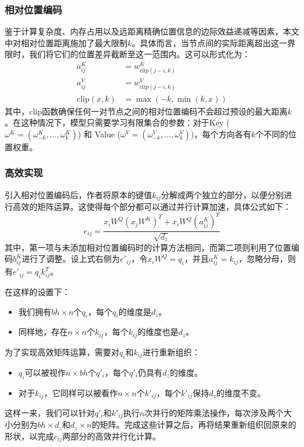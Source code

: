 \subsubsection{相对位置编码}
鉴于计算复杂度、内存占用以及远距离精确位置信息的边际效益递减等因素，本文中对相对位置距离施加了最大限制$k$。具体而言，当节点间的实际距离超出这一界限时，我们将它们的位置差异截断至这一范围内。这可以形式化为：
\begin{align*}
    a_{ij}^K &= w_{\text{clip}(j-i, k)}^K\\
    a_{ij}^V &= w_{\text{clip}(j-i, k)}^V\\
    \text{clip}(x, k) &= \max(-k, \min(k, x))
\end{align*}
其中，$\text{clip}$函数确保任何一对节点之间的相对位置编码不会超过预设的最大距离$k$。在这种情况下，模型只需要学习有限集合的参数：对于Key ($\omega^K = (\omega_{-k}^K, \ldots, \omega_k^K)$) 和 Value ($\omega^V = (\omega_{-k}^V, \ldots, \omega_k^V)$)，每个方向各有$k$个不同的位置权重。
\subsubsection{高效实现}
引入相对位置编码后，作者将原本的键值$k_{ij}$分解成两个独立的部分，以便分别进行高效的矩阵运算。这使得每个部分都可以通过并行计算加速，具体公式如下：
$$
e_{ij} = \frac{x_i W^Q \left( x_j W^K \right)^T + x_i W^Q \left( a_{ij}^K \right)^T}{\sqrt{d_z}}
$$
其中，第一项与未添加相对位置编码时的计算方法相同，而第二项则利用了位置编码$b_{ij}^K$进行了调整。设上式右侧为$e'_{ij}$，令$x_i W^Q = q_i$，并且$a_{ij}^K = k_{ij}$，忽略分母，则有$e'_{ij} = q_i k_{ij}^T$。

在这样的设置下：
\begin{itemize}
\item 我们拥有$bh \times n$个$q_i$，每个$q_i$的维度是$d_z$。
\item 同样地，存在$n \times n$个$k_{ij}$，每个$k_{ij}$的维度也是$d_z$。
\end{itemize}

为了实现高效矩阵运算，需要对$q_i$和$k_{ij}$进行重新组织：
\begin{itemize}
\item $q_i$可以被视作$n \times bh$个$q'_i$，每个$q'_i$仍具有$d_z$的维度。
\item 对于$k_{ij}$，它同样可以被看作$n \times n$个$k'_{ij}$，每个$k'_{ij}$保持$d_z$的维度不变。
\end{itemize}

这样一来，我们可以针对$q'_i$和$k'_{ij}$执行$n$次并行的矩阵乘法操作，每次涉及两个大小分别为$bh \times d_z$和$d_z \times n$的矩阵。完成这些计算之后，再将结果重新组织回原来的形状，以完成$e_{ij}$两部分的高效并行化计算。


